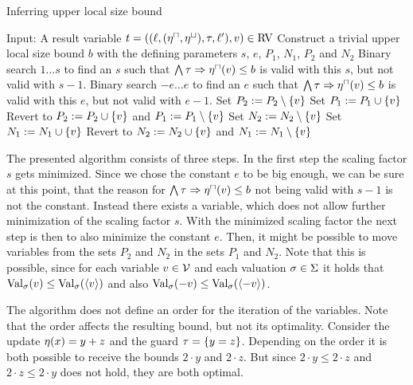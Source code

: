 \begin{algorithm}
\caption{Inferring upper local size bound}\label{ulsb_algorithm}
\begin{algorithmic}[1]
  \State Input: A result variable $t = ((\ell,(\eta^\sqcap,\eta^\sqcup),\tau,\ell'),v) \in \text{RV}$
  \State Construct a trivial upper local size bound $b$ with the defining parameters $s$, $e$, $P_1$, $N_1$, $P_2$ and $N_2$
  \State Binary search $1 \dots s$ to find an $s$ such that $\bigwedge \tau \Rightarrow \eta^\sqcap(v) \leq b$ is valid with this $s$, but not valid with $s-1$.
  \State Binary search $-e \dots e$ to find an $e$ such that $\bigwedge \tau \Rightarrow \eta^\sqcap(v) \leq b$ is valid with this $e$, but not valid with $e-1$.
    \State Set $P_2 := P_2 \setminus \lbrace v \rbrace$
      \State Set $P_1 := P_1 \cup \lbrace v \rbrace$
        \State Revert to $P_2 := P_2 \cup \lbrace v \rbrace$ and $P_1 := P_1 \setminus \lbrace v \rbrace$
      \EndIf
    \EndIf
    \State Set $N_2 := N_2 \setminus \lbrace v \rbrace$
      \State Set $N_1 := N_1 \cup \lbrace v \rbrace$
        \State Revert to $N_2 := N_2 \cup \lbrace v \rbrace$ and $N_1 := N_1 \setminus \lbrace v \rbrace$
      \EndIf
    \EndIf
  \EndFor
\end{algorithmic}
\end{algorithm}

The presented algorithm consists of three steps.
In the first step the scaling factor $s$ gets minimized.
Since we chose the constant $e$ to be big enough, we can be sure at this point, that the reason for $\bigwedge \tau \Rightarrow \eta^\sqcap(v) \leq b$ not being valid with $s-1$ is not the constant.
Instead there exists a variable, which does not allow further minimization of the scaling factor $s$.
With the minimized scaling factor the next step is then to also minimize the constant $e$.
Then, it might be possible to move variables from the sets $P_2$ and $N_2$ in the sets $P_1$ and $N_2$.
Note that this is possible, since for each variable $v \in \mathcal{V}$ and each valuation $\sigma \in \Sigma$ it holds that $\text{Val}_{\sigma}(v) \leq \text{Val}_{\sigma}(\langle v\rangle)$ and also $\text{Val}_{\sigma}(-v) \leq \text{Val}_{\sigma}(\langle-v\rangle)$.

The algorithm does not define an order for the iteration of the variables.
Note that the order affects the resulting bound, but not its optimality.
Consider the update $\eta(x) = y + z$ and the guard $\tau = \lbrace y = z \rbrace$.
Depending on the order it is both possible to receive the bounds $2 \cdot y$ and $2 \cdot z$.
But since $2 \cdot y \leq 2 \cdot z$ and $2 \cdot z \leq 2 \cdot y$ does not hold, they are both optimal.

